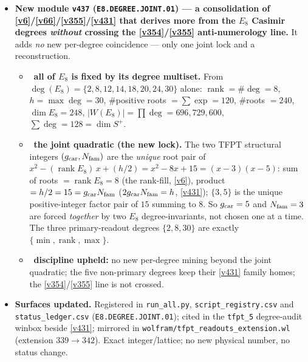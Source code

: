 \begin{itemize}
\item \textbf{New module \texttt{v437} (\texttt{E8.DEGREE.JOINT.01}) --- a consolidation of \vref{v6}/\vref{v66}/\vref{v355}/\vref{v431}
that derives more from the $E_8$ Casimir degrees \emph{without} crossing the \vref{v354}/\vref{v355}
anti-numerology line.} It adds \emph{no} new per-degree coincidence --- only one joint lock and a reconstruction.
\begin{itemize}
\item \mE\ \textbf{all of $E_8$ is fixed by its degree multiset.} From $\deg(E_8)=\{2,8,12,14,18,20,24,30\}$
alone: $\operatorname{rank}=\#\deg=8$, $h=\max\deg=30$, $\#$positive roots $=\sum\exp=120$, $\#$roots $=240$,
$\dim E_8=248$, $|W(E_8)|=\prod\deg=696{,}729{,}600$, $\sum\deg=128=\dim S^+$.
\item \mE\ \textbf{the joint quadratic (the new lock).} The two TFPT structural integers $(g_{\mathrm{car}},N_{\mathrm{fam}})$ are
the \emph{unique} root pair of $x^2-(\operatorname{rank}E_8)\,x+(h/2)=x^2-8x+15=(x-3)(x-5)$: sum of roots
$=\operatorname{rank}E_8=8$ (the rank-fill, \vref{v6}), product $=h/2=15=g_{\mathrm{car}}N_{\mathrm{fam}}$ ($2g_{\mathrm{car}}N_{\mathrm{fam}}=h$,
\vref{v431}); $\{3,5\}$ is the unique positive-integer factor pair of $15$ summing to $8$. So $g_{\mathrm{car}}=5$ and
$N_{\mathrm{fam}}=3$ are forced \emph{together} by two $E_8$ degree-invariants, not chosen one at a time. The three
primary-readout degrees $\{2,8,30\}$ are exactly $\{\min,\operatorname{rank},\max\}$.
\item \mE\ \textbf{discipline upheld:} no new per-degree mining beyond the joint quadratic; the five
non-primary degrees keep their \vref{v431} family homes; the \vref{v354}/\vref{v355} line is not crossed.
\end{itemize}
\item \textbf{Surfaces updated.} Registered in \texttt{run\_all.py}, \texttt{script\_registry.csv} and
\texttt{status\_ledger.csv} (\texttt{E8.DEGREE.JOINT.01}); cited in the \texttt{tfpt\_5} degree-audit winbox
beside \vref{v431}; mirrored in \texttt{wolfram/tfpt\_readouts\_extension.wl} (extension $339\to342$). Exact
integer/lattice; no new physical number, no status change.
\end{itemize}


